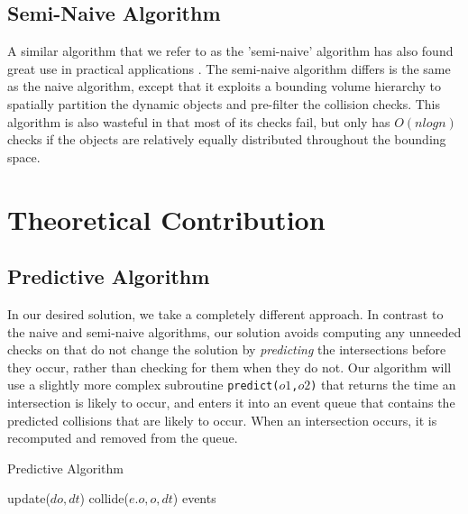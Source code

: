\documentclass[CEJCS,PDF]{cej} %
\begin{document}
\subsection{Semi-Naive Algorithm}

A similar algorithm that we refer to as the 'semi-naive' algorithm has also found great use in practical applications \cite{Bittner02hierarchicaltechniques}.  The semi-naive algorithm differs is the same as the naive algorithm, except that it exploits a bounding volume hierarchy to spatially partition the dynamic objects and pre-filter the collision checks.  This algorithm is also wasteful in that most of its checks fail, but only has $O(n log n)$ checks if the objects are relatively equally distributed throughout the bounding space.

\section{Theoretical Contribution}
\label{sec:theocont}
\subsection{Predictive Algorithm}

In our desired solution, we take a completely different approach.  In contrast to the naive and semi-naive algorithms, our solution avoids computing any unneeded checks on  that do not change the solution by \textit{predicting} the intersections before they occur, rather than checking for them when they do not.  Our algorithm will use a slightly more complex subroutine \texttt{predict($o1$,$o2$)} that returns the time an intersection is likely to occur, and enters it into an event queue that contains the predicted collisions that are likely to occur.  When an intersection occurs, it is recomputed and removed from the queue.

\begin{algorithm}
\caption{Predictive Algorithm}
\begin{algorithmic}
\STATE {} %
		\STATE update($do,dt$)  
	\ENDFOR
	\STATE {}
				\STATE collide($e.o, o, dt$) 
			\ENDIF
		\ENDFOR
	\ENDFOR
\ENDFOR
\RETURN events
\end{algorithmic}
\end{algorithm}
\end{document}
